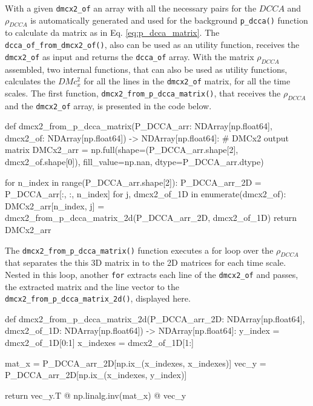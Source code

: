 \documentclass[article]{jss}
\begin{document}
With a given \verb"dmcx2_of" an array with all the necessary pairs for the $DCCA$ and $\rho_{DCCA}$ is automatically generated and used for the background \verb"p_dcca()" function to calculate da matrix as in Eq. \ref{eq:p_dcca_matrix}. The \verb"dcca_of_from_dmcx2_of()", also can be used as an utility function, receives the  \verb"dmcx2_of" as input and returns the \verb"dcca_of" array. With the matrix $\rho_{DCCA}$ assembled, two internal functions, that can also be used as utility functions, calculates the $DMc_{x}^2$ for all the lines in the \verb"dmcx2_of" matrix, for all the time scales. The first function, \verb"dmcx2_from_p_dcca_matrix()", that receives the $\rho_{DCCA}$ and the \verb"dmcx2_of" array, is presented in the code below.

\begin{Code}
def dmcx2_from_p_dcca_matrix(P_DCCA_arr: NDArray[np.float64], 
      dmcx2_of: NDArray[np.float64]) -> NDArray[np.float64]:   
    # DMCx2 output matrix
    DMCx2_arr = np.full(shape=(P_DCCA_arr.shape[2], dmcx2_of.shape[0]),
    fill_value=np.nan, dtype=P_DCCA_arr.dtype)

    for n_index in range(P_DCCA_arr.shape[2]):
        P_DCCA_arr_2D = P_DCCA_arr[:, :, n_index]
        for j,  dmcx2_of_1D in enumerate(dmcx2_of):
            DMCx2_arr[n_index, j] = dmcx2_from_p_dcca_matrix_2d(P_DCCA_arr_2D,
                                                                dmcx2_of_1D)
    return DMCx2_arr
\end{Code}

The \verb"dmcx2_from_p_dcca_matrix()" function executes a for loop over the $\rho_{DCCA}$ that separates the this 3D matrix in to the 2D matrices for each time scale. Nested in this loop, another \verb"for" extracts each line of the \verb"dmcx2_of" and passes, the extracted matrix and the line vector to the \verb"dmcx2_from_p_dcca_matrix_2d()", displayed here.

\begin{Code}
def dmcx2_from_p_dcca_matrix_2d(P_DCCA_arr_2D: NDArray[np.float64], 
          dmcx2_of_1D: NDArray[np.float64]) -> NDArray[np.float64]:   
  y_index = dmcx2_of_1D[0:1]
  x_indexes = dmcx2_of_1D[1:]

  mat_x = P_DCCA_arr_2D[np.ix_(x_indexes, x_indexes)]
  vec_y = P_DCCA_arr_2D[np.ix_(x_indexes, y_index)]

  return vec_y.T @ np.linalg.inv(mat_x) @ vec_y
\end{Code}
\end{document}
